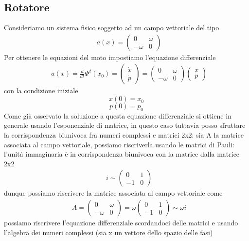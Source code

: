 \documentclass[
10pt, %
a4paper, %
oneside, %
headinclude,footinclude, %
BCOR5mm, %
]{scrartcl}
\begin{document}
\subsection{Rotatore}
Consideriamo un sistema fisico soggetto ad un campo vettoriale del tipo
\begin{align*}
	&a(x) = 
	\begin{pmatrix}
		0&\omega\\
		-\omega&0
	\end{pmatrix}
\end{align*}
Per ottenere le equazioni del moto impostiamo l'equazione differenziale
\begin{align*}
	&a(x) = \frac{d}{dt}\Phi^t(x_0) = 
	\begin{pmatrix}
		\dot{x}\\
		\dot{p}
	\end{pmatrix}=
	\begin{pmatrix}
		0&\omega\\
		-\omega&0
	\end{pmatrix}
	\begin{pmatrix}
		{x}\\
		{p}
	\end{pmatrix}
\end{align*}
con la condizione iniziale
\[x(0) = x_0\]
\[p(0) = p_0\]
Come già osservato la soluzione a questa equazione differenziale si ottiene in generale usando l'esponenziale di matrice, in questo caso tuttavia posso sfruttare la corrispondenza biunivoca fra numeri complessi e matrici 2x2: sia A la matrice associata al campo vettoriale, possiamo riscriverla usando le matrici di Pauli: l'unità immaginaria è in corrispondenza biunivoca con la matrice dalla matrice 2x2
\begin{align*}
	&i \sim \begin{pmatrix}
		0&1\\-1&0
	\end{pmatrix}
\end{align*}
dunque possiamo riscrivere la matrice associata al campo vettoriale come
\begin{align*}
	&A =
	\begin{pmatrix}
		0&\omega\\
		-\omega&0
	\end{pmatrix}=
	\omega 
	\begin{pmatrix}
		0&1\\-1&0
	\end{pmatrix}\sim
	\omega i
\end{align*}
possiamo riscrivere l'equazione differenziale scordandoci delle matrici e usando l'algebra dei numeri complessi (sia x un vettore dello spazio delle fasi)
\end{document}
